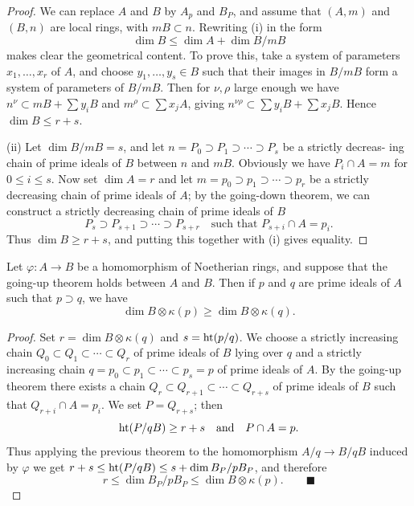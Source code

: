 \begin{proof}
We can replace $A$ and $B$ by $A_p$ and $B_P$, and assume that $(A, m)$ and
$(B, n)$ are local rings, with $mB \subset n$. Rewriting (i) in the form
\[
  \dim B \le \dim A + \dim B/mB
\]
makes clear the geometrical content. To prove this, take a system of
parameters $x_1, \ldots, x_r$ of $A$, and choose $y_1, \ldots, y_s \in B$ such that their images
in $B/mB$ form a system of parameters of $B/mB$. Then for $\nu, \rho$ large enough
we have $n^\nu \subset mB + \sum y_iB$ and $m^\rho \subset \sum x_jA$, giving $n^{\nu\rho} \subset \sum y_iB + \sum x_jB$.
Hence $\dim B \le r + s$.

(ii) Let $\dim B/mB = s$, and let $n = P_0 \supset P_1 \supset \cdots \supset P_s$ be a strictly decreas-
ing chain of prime ideals of $B$ between $n$ and $mB$. Obviously we have
$P_i \cap A = m$ for $0 \le i \le s$. Now set $\dim A = r$ and let $m = p_0 \supset p_1 \supset \cdots \supset p_r$
be a strictly decreasing chain of prime ideals of $A$; by the going-down
theorem, we can construct a strictly decreasing chain of prime ideals of $B$
\[
  P_s \supset P_{s+1} \supset \cdots \supset P_{s+r} \quad \text{such that } P_{s+i} \cap A = p_i.
\]
Thus $\dim B \ge r + s$, and putting this together with (i) gives equality.
\end{proof}

\begin{theorem}\label{thm:15.2}
Let $\varphi\colon A \to B$ be a homomorphism of Noetherian rings,
and suppose that the going-up theorem holds between $A$ and $B$. Then if
$p$ and $q$ are prime ideals of $A$ such that $p \supset q$, we have
\[
  \dim B \otimes \kappa(p) \ge \dim B \otimes \kappa(q).
\]
\end{theorem}

\begin{proof}
Set $r = \dim B \otimes \kappa(q)$ and $s = \operatorname{ht}(p/q)$. We choose a strictly
increasing chain $Q_0 \subset Q_1 \subset \cdots \subset Q_r$ of prime ideals of $B$ lying over $q$ and
a strictly increasing chain $q = p_0 \subset p_1 \subset \cdots \subset p_s = p$ of prime ideals of $A$.
By the going-up theorem there exists a chain $Q_r \subset Q_{r+1} \subset \cdots \subset Q_{r+s}$ of
prime ideals of $B$ such that $Q_{r+i} \cap A = p_i$. We set $P = Q_{r+s}$; then
\[
  \operatorname{ht}(P/qB) \ge r + s \quad \text{and} \quad P \cap A = p.
\]
Thus applying the previous theorem to the homomorphism $A/q \to B/qB$
induced by $\varphi$ we get $r + s \le \operatorname{ht}(P/qB) \le s + \dim B_P/pB_P$, and therefore
\[
  r \le \dim B_P/pB_P \le \dim B \otimes \kappa(p). \qquad\blacksquare
\]
\end{proof}

